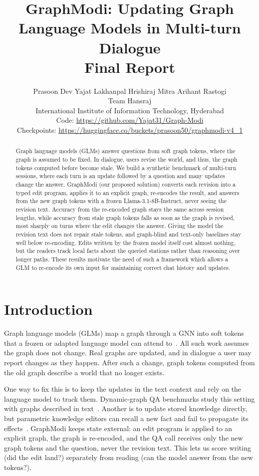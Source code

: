 \documentclass[11pt]{article}
\title{GraphModi: Updating Graph Language Models in Multi-turn Dialogue\\
\large Final Report}
\author{
  Prasoon Dev\quad
  Yajat Lakhanpal\quad
  Hrishiraj Mitra\quad
  Arihant Rastogi \\
  Team Hansraj \\
  International Institute of Information Technology, Hyderabad \\[4pt]
  \normalfont\small Code: \url{https://github.com/Yajat31/Graph-Modi} \\
  \normalfont\small Checkpoints: \url{https://huggingface.co/buckets/prasoon50/graphmodi-v4_1}
}
\begin{document}
\maketitle

\begin{abstract}
Graph language models (GLMs) answer questions from soft graph tokens, where the graph is assumed to be fixed.
In dialogue, users revise the world, and thus, the graph tokens computed before become stale.
We build a synthetic benchmark of multi-turn sessions, where each turn is an update followed by a question and many updates change the answer.
GraphModi (our proposed solution) converts each revision into a typed edit program, applies it to an explicit graph, re-encodes the result, and answers from the new graph tokens with a frozen Llama-3.1-8B-Instruct, never seeing the revision text.
Accuracy from the re-encoded graph stays the same across session lengths, while accuracy from stale graph tokens falls as soon as the graph is revised, most sharply on turns where the edit changes the answer.
Giving the model the revision text does not repair stale tokens, and graph-blind and text-only baselines stay well below re-encoding.
Edits written by the frozen model itself cost almost nothing, but the readers track local facts about the queried stations rather than reasoning over longer paths.
These results motivate the need of such a framework which allows a GLM to re-encode its own input for maintaining correct chat history and updates.
\end{abstract}

\section{Introduction}
\label{sec:intro}

Graph language models (GLMs) map a graph through a GNN into soft tokens that a frozen or adapted language model can attend to~\cite{perozzi2024graphtoken,wang2024teaglm,he2024gretriever,plenz-frank-2024-graph}.
All such work assumes the graph does not change.
Real graphs are updated, and in dialogue a user may report changes as they happen.
After such a change, graph tokens computed from the old graph describe a world that no longer exists.

One way to fix this is to keep the updates in the text context and rely on the language model to track them.
Dynamic-graph QA benchmarks study this setting with graphs described in text~\cite{comrie2025dygraphqa}.
Another is to update stored knowledge directly, but parametric knowledge editors can recall a new fact and fail to propagate its effects~\cite{zhong-etal-2023-mquake}.
GraphModi keeps state external: an edit program is applied to an explicit graph, the graph is re-encoded, and the QA call receives only the new graph tokens and the question, never the revision text.
This lets us score writing (did the edit land?) separately from reading (can the model answer from the new tokens?).
\end{document}
